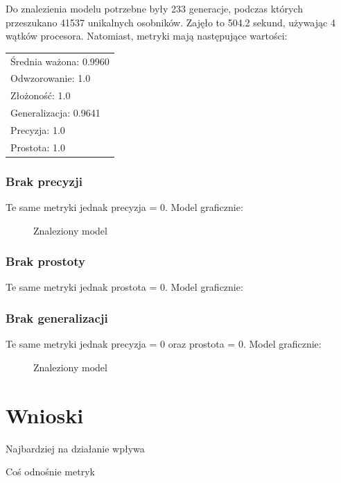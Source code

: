 Do znalezienia modelu potrzebne były 233 generacje, podczas których przeszukano 41537 unikalnych osobników. Zajęło to 504.2 sekund, używając 4 wątków procesora. Natomiast, metryki mają następujące wartości: 

 \begin{center}
  \begin{tabular}{l}
	Średnia ważona: 0.9960 \\
	Odwzorowanie: 1.0 \\
	Złożoność: 1.0 \\
	Generalizacja: 0.9641 \\
	Precyzja: 1.0 \\
	Prostota: 1.0
  \end{tabular}
 \end{center}

\subsubsection{Brak precyzji}
Te same metryki jednak precyzja = 0.
Model graficznie:
\begin{figure}[!ht]
	\caption{\label{fig:flow_chart}Znaleziony model}
\end{figure}
\subsubsection{Brak prostoty}
Te same metryki jednak prostota = 0.
Model graficznie:

\subsubsection{Brak generalizacji}
Te same metryki jednak precyzja = 0 oraz prostota = 0.
Model graficznie:
\begin{figure}[!ht]
	\caption{\label{fig:flow_chart}Znaleziony model}
\end{figure}
\section{Wnioski}
Najbardziej na działanie wpływa

Coś odnośnie metryk
